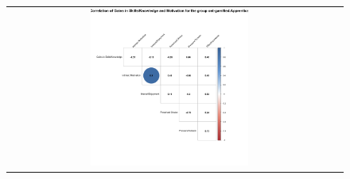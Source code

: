 \begin{figure}[htb]
\begin{tabular}{cc}
 \includegraphics[width=0.5\textwidth]{images/chap-evaluation/corr-effective-pilot/ont-gamifiedApprentice1.png}
 \end{tabular}
 \fautor
\end{figure}

